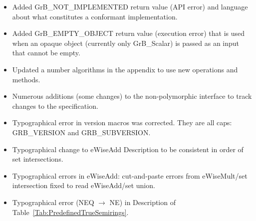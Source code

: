 \begin{itemize}
\item Added {\sf GrB\_NOT\_IMPLEMENTED} return value (API error) and language about what constitutes a conformant implementation.
\item Added {\sf GrB\_EMPTY\_OBJECT} return value (execution error) that is used when an opaque object (currently only {\sf GrB\_Scalar}) is passed as an input that cannot be empty.
\item Updated a number algorithms in the appendix to use new operations and methods.
\item Numerous additions (some changes) to the non-polymorphic interface to track changes to the specification.
\item Typographical error in version macros was corrected.  They are all caps: {\sf GRB\_VERSION} and {\sf GRB\_SUBVERSION}.
\item Typographical change to eWiseAdd Description to be consistent in order of set intersections.
\item Typographical errors in eWiseAdd: cut-and-paste errors from eWiseMult/set intersection fixed to read eWiseAdd/set union.
\item Typographical error ({\sf NEQ} $\rightarrow$ {\sf NE}) in Description of Table~\ref{Tab:PredefinedTrueSemirings}.
\end{itemize}


